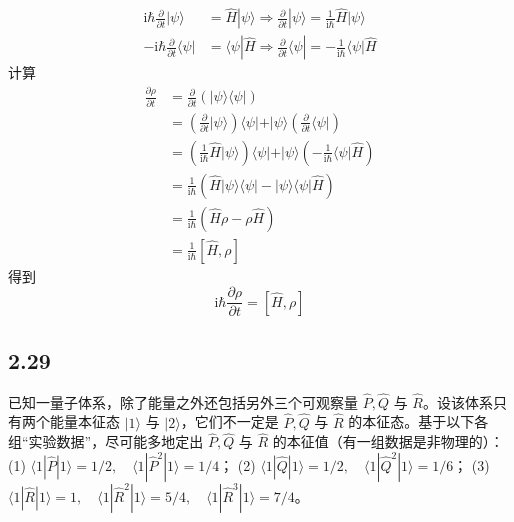 \begin{equation}
    \begin{aligned}
        \mathrm{i}\hbar \frac{\partial}{\partial t}|\psi \rangle &=\hat{H}|\psi \rangle \Rightarrow \frac{\partial}{\partial t}|\psi \rangle =\frac{1}{\mathrm{i}\hbar}\hat{H}|\psi \rangle 
\\
-\mathrm{i}\hbar \frac{\partial}{\partial t}\langle \psi |&=\langle \psi |\hat{H}\Rightarrow \frac{\partial}{\partial t}\langle \psi |=-\frac{1}{\mathrm{i}\hbar}\langle \psi |\hat{H}
    \end{aligned}
\end{equation}
计算
\begin{equation}
    \begin{aligned}
        \frac{\partial \rho}{\partial t}&=\frac{\partial}{\partial t}\left( |\psi \rangle \langle \psi | \right) 
\\
&=\left( \frac{\partial}{\partial t}|\psi \rangle \right) \langle \psi |+|\psi \rangle \left( \frac{\partial}{\partial t}\langle \psi | \right) 
\\
&=\left( \frac{1}{\mathrm{i}\hbar}\hat{H}|\psi \rangle \right) \langle \psi |+|\psi \rangle \left( -\frac{1}{\mathrm{i}\hbar}\langle \psi |\hat{H} \right) 
\\
&=\frac{1}{\mathrm{i}\hbar}\left( \hat{H}|\psi \rangle \langle \psi |-|\psi \rangle \langle \psi |\hat{H} \right) 
\\
&=\frac{1}{\mathrm{i}\hbar}\left( \hat{H}\rho -\rho \hat{H} \right) 
\\
&=\frac{1}{\mathrm{i}\hbar}\left[ \hat{H},\rho \right] 
    \end{aligned}
\end{equation}
得到
\begin{equation}
    \mathrm{i}\hbar \frac{\partial \rho}{\partial t}=\left[ \hat{H},\rho \right] 
\end{equation}



\subsection{2.29}
已知一量子体系，除了能量之外还包括另外三个可观察量 $\hat{P}, \hat{Q}$ 与 $\hat{R}$。设该体系只有两个能量本征态 $|1\rangle$ 与 $|2\rangle$，它们不一定是 $\hat{P}, \hat{Q}$ 与 $\hat{R}$ 的本征态。基于以下各组“实验数据”，尽可能多地定出 $\hat{P}, \hat{Q}$ 与 $\hat{R}$ 的本征值（有一组数据是非物理的）：
(1) $\langle 1|\hat{P}|1\rangle = 1/2, \quad \langle 1|\hat{P}^2|1\rangle = 1/4$；
(2) $\langle 1|\hat{Q}|1\rangle = 1/2, \quad \langle 1|\hat{Q}^2|1\rangle = 1/6$；
(3) $\langle 1|\hat{R}|1\rangle = 1, \quad \langle 1|\hat{R}^2|1\rangle = 5/4, \quad \langle 1|\hat{R}^3|1\rangle = 7/4$。

